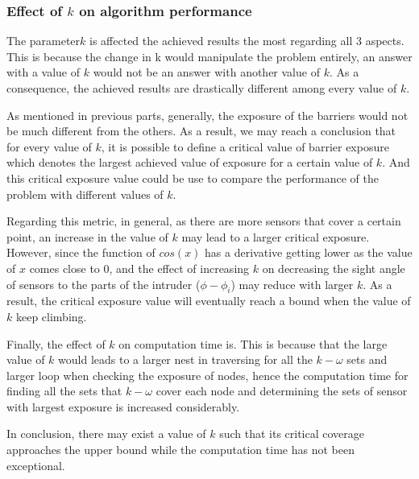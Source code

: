 \subsubsection{Effect of $k$ on algorithm performance}

The parameter$k$ is affected the achieved results the most regarding all 3 aspects. This is because the change in k would manipulate the problem entirely, an answer with a value of $k$ would not be an answer with another value of $k$. As a consequence, the achieved results are drastically different among every value of $k$.

As mentioned in previous parts, generally, the exposure of the barriers would not be much different from the others. As a result, we may reach a conclusion that for every value of $k$, it is possible to define a critical value of barrier exposure which denotes the largest achieved value of exposure for a certain value of $k$. And this critical exposure value could be use to compare the performance of the problem with different values of $k$.

Regarding this metric, in general, as there are more sensors that cover a certain point, an increase in the value of $k$ may lead to a larger critical exposure. However, since the function of $cos(x)$ has a derivative getting lower as the value of $x$ comes close to 0, and the effect of increasing $k$ on decreasing the sight angle of sensors to the parts of the intruder ($\phi - \phi_i$) may reduce with larger $k$. As a result, the critical exposure value will eventually reach a bound when the value of $k$ keep climbing.

Finally, the effect of $k$ on computation time is. This is because that the large value of $k$ would leads to a larger nest in traversing for all the $k-\omega$ sets and larger loop when checking the exposure of nodes, hence the computation time for finding all the sets that $k-\omega$ cover each node and determining the sets of sensor with largest exposure is increased considerably.

In conclusion, there may exist a value of $k$ such that its critical coverage approaches the upper bound while the computation time has not been exceptional.

